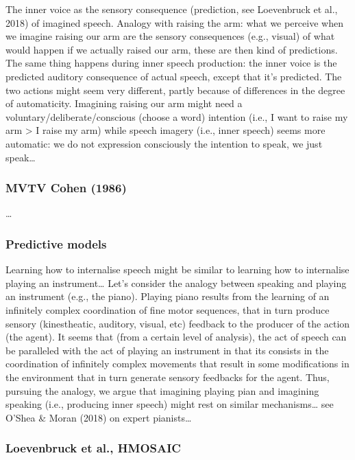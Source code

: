 \documentclass[a4paper,11pt,oneside,oldfontcommands]{memoir}
\begin{document}
The inner voice as the sensory consequence (prediction, see Loevenbruck
et al., 2018) of imagined speech. Analogy with raising the arm: what we
perceive when we imagine raising our arm are the sensory consequences
(e.g., visual) of what would happen if we actually raised our arm, these
are then kind of predictions. The same thing happens during inner speech
production: the inner voice is the predicted auditory consequence of
actual speech, except that it's predicted. The two actions might seem
very different, partly because of differences in the degree of
automaticity. Imagining raising our arm might need a
voluntary/deliberate/conscious (choose a word) intention (i.e., I want
to raise my arm \textgreater{} I raise my arm) while speech imagery
(i.e., inner speech) seems more automatic: we do not expression
consciously the intention to speak, we just speak\ldots{}

\subsubsection{MVTV Cohen (1986)}\label{mvtv-cohen-1986}

\ldots{}

\subsubsection{Predictive models}\label{predictive-models}

Learning how to internalise speech might be similar to learning how to
internalise playing an instrument\ldots{} Let's consider the analogy
between speaking and playing an instrument (e.g., the piano). Playing
piano results from the learning of an infinitely complex coordination of
fine motor sequences, that in turn produce sensory (kinestheatic,
auditory, visual, etc) feedback to the producer of the action (the
agent). It seems that (from a certain level of analysis), the act of
speech can be paralleled with the act of playing an instrument in that
its consists in the coordination of infinitely complex movements that
result in some modifications in the environment that in turn generate
sensory feedbacks for the agent. Thus, pursuing the analogy, we argue
that imagining playing pian and imagining speaking (i.e., producing
inner speech) might rest on similar mechanisms\ldots{} see O'Shea \&
Moran (2018) on expert pianists\ldots{}

\subsubsection{Loevenbruck et al.,
HMOSAIC}\label{loevenbruck-et-al.-hmosaic}
\end{document}
